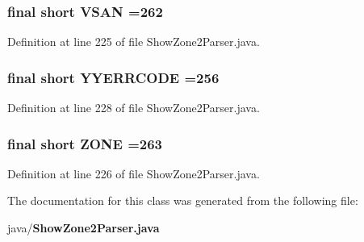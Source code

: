 \subsubsection[{V\+S\+A\+N}]{\setlength{\rightskip}{0pt plus 5cm}final short V\+S\+A\+N =262\hspace{0.3cm}{\ttfamily [static]}}\label{classorg_1_1smallfoot_1_1parser_1_1zone_1_1ShowZone2Parser_a88c9c4c890956fcca92121d318a1a834}


Definition at line 225 of file Show\+Zone2\+Parser.\+java.

\subsubsection[{Y\+Y\+E\+R\+R\+C\+O\+D\+E}]{\setlength{\rightskip}{0pt plus 5cm}final short Y\+Y\+E\+R\+R\+C\+O\+D\+E =256\hspace{0.3cm}{\ttfamily [static]}}\label{classorg_1_1smallfoot_1_1parser_1_1zone_1_1ShowZone2Parser_a1c58472ea6621d2f613831e08d10dba3}


Definition at line 228 of file Show\+Zone2\+Parser.\+java.

\subsubsection[{Z\+O\+N\+E}]{\setlength{\rightskip}{0pt plus 5cm}final short Z\+O\+N\+E =263\hspace{0.3cm}{\ttfamily [static]}}\label{classorg_1_1smallfoot_1_1parser_1_1zone_1_1ShowZone2Parser_a8ddd6c0fce0f972519976a2c9ca1aadd}


Definition at line 226 of file Show\+Zone2\+Parser.\+java.



The documentation for this class was generated from the following file\+:\begin{DoxyCompactItemize}
\item 
java/{\bf Show\+Zone2\+Parser.\+java}\end{DoxyCompactItemize}
